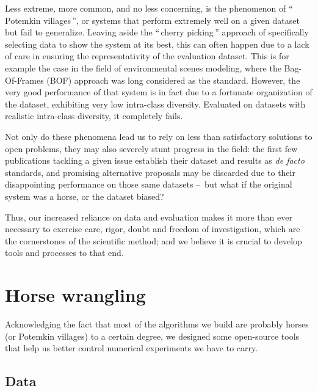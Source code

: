 \documentclass[a4paper,fleqn]{tufte-handout}
\begin{document}
Less extreme, more common, and no less concerning, is the phenomenon of ``\,Potemkin villages\,'', or systems that perform extremely well on a given dataset but fail to generalize. Leaving aside the ``\,cherry picking\,'' approach of specifically selecting data to show the system at its best, this can often happen due to a lack of care in ensuring the representativity of the evaluation dataset. This is for example the case in the field of environmental scenes modeling, where the Bag-Of-Frames (BOF) approach\cite{aucouturier2007bag} was long considered as the standard. However, the very good performance of that system is in fact due to a fortunate organization of the dataset\cite{lagrange:hal-01082501}, exhibiting very low intra-class diversity. Evaluated on datasets with realistic intra-class diversity, it completely fails.

Not only do these phenomena lead us to rely on less than satisfactory solutions to open problems, they may also severely stunt progress in the field: the first few publications tackling a given issue establish their dataset and results as \emph{de facto} standards, and promising alternative proposals may be discarded due to their disappointing performance on those same datasets --~but what if the original system was a horse, or the dataset biased?

Thus, our increased reliance on data and evaluation makes it more than ever necessary to exercise care, rigor, doubt and freedom of investigation, which are the cornerstones of the scientific method; and we believe it is crucial to develop tools and processes to that end.

\section{Horse wrangling}

Acknowledging the fact that most of the algorithms we build are probably horses (or Potemkin villages) to a certain degree, we designed some open-source tools that help us better control numerical experiments we have to carry.

\subsection{Data}
\end{document}
